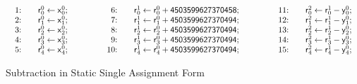 \begin{figure}
  \centering
  \[
  \begin{array}{lclcl}
    \begin{array}{rcl}
    \textmd{1:} && \dslcode{r}^0_0 \leftarrow \dslcode{x}^0_0; \\
    \textmd{2:} && \dslcode{r}^0_1 \leftarrow \dslcode{x}^0_1; \\
    \textmd{3:} && \dslcode{r}^0_2 \leftarrow \dslcode{x}^0_2; \\
    \textmd{4:} && \dslcode{r}^0_3 \leftarrow \dslcode{x}^0_3; \\
    \textmd{5:} && \dslcode{r}^0_4 \leftarrow \dslcode{x}^0_4; \\
    \end{array}
    &\hspace{.05\textwidth}&
    \begin{array}{rcl}
    \textmd{6:} && 
      \dslcode{r}^1_0 \leftarrow \dslcode{r}^0_0 + \dslcode{4503599627370458}; \\
    \textmd{7:} &&
      \dslcode{r}^1_1 \leftarrow \dslcode{r}^0_1 + \dslcode{4503599627370494}; \\
    \textmd{8:} &&
      \dslcode{r}^1_2 \leftarrow \dslcode{r}^0_2 + \dslcode{4503599627370494}; \\
    \textmd{9:} &&
      \dslcode{r}^1_3 \leftarrow \dslcode{r}^0_3 + \dslcode{4503599627370494}; \\
    \textmd{10:} && 
      \dslcode{r}^1_4 \leftarrow \dslcode{r}^0_4 + \dslcode{4503599627370494};\\
    \end{array}
    &\hspace{.05\textwidth}&
    \begin{array}{rcl}
    \textmd{11:} && \dslcode{r}^2_0 \leftarrow \dslcode{r}^1_0 - \dslcode{y}^0_0; \\
    \textmd{12:} && \dslcode{r}^2_1 \leftarrow \dslcode{r}^1_1 - \dslcode{y}^0_1; \\
    \textmd{13:} && \dslcode{r}^2_2 \leftarrow \dslcode{r}^1_2 - \dslcode{y}^0_2; \\
    \textmd{14:} && \dslcode{r}^2_3 \leftarrow \dslcode{r}^1_3 - \dslcode{y}^0_3; \\
    \textmd{15:} && \dslcode{r}^2_4 \leftarrow \dslcode{r}^1_4 - \dslcode{y}^0_4;
    \end{array}
  \end{array}
  \]
  \caption{Subtraction  in Static Single Assignment Form}
  \label{figure:translation:subtraction-ssa}
\end{figure}

